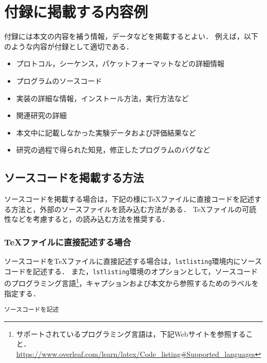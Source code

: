 
\chapter{付録に掲載する内容例}\label{apdx:Example}

付録には本文の内容を補う情報，データなどを掲載するとよい．
例えば，以下のような内容が付録として適切である．

\begin{itemize}
\item プロトコル，シーケンス，パケットフォーマットなどの詳細情報
\item プログラムのソースコード
\item 実装の詳細な情報，インストール方法，実行方法など
\item 関連研究の詳細
\item 本文中に記載しなかった実験データおよび評価結果など
\item 研究の過程で得られた知見，修正したプログラムのバグなど
\end{itemize}


\section{ソースコードを掲載する方法}

ソースコードを掲載する場合は，下記の様に{\TeX}ファイルに直接コードを記述する方法と，外部のソースファイルを読み込む方法がある．
{\TeX}ファイルの可読性などを考慮すると，の読み込む方法を推奨する．


\subsection{{\TeX}ファイルに直接記述する場合}
\label{subsec:lstlisting}

ソースコードを{\TeX}ファイルに直接記述する場合は，\texttt{lstlisting}環境内にソースコードを記述する．
また，\texttt{lstlisting}環境のオプションとして，ソースコードのプログラミング言語\footnote{サポートされているプログラミング言語は，下記Webサイトを参照すること．\\\url{https://www.overleaf.com/learn/latex/Code_listing#Supported_languages}}，キャプションおよび本文から参照するためのラベルを指定する．

\begin{code}
\begin{lstlisting}[language=プログラミング言語,caption=キャプション,label=src:ラベル]
ソースコードを記述
\end{lstlisting}
\end{code}%

